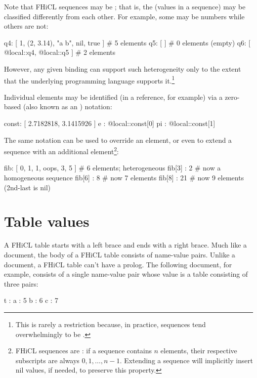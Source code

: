 \documentclass{memarticle}
\newcommand{\fhicl}%
 {FHiCL\xspace}
\begin{document}
Note that \fhicl sequences
may be ;
that is,
the  (values in a sequence)
may be classified differently from each other.
For example,
some may be numbers while others are not:
\Needspace{0.50in}
\begin{fcllisting}[texcl,escapechar=`]
q4: [ 1, (2, 3.14), "a b", nil, true ]  # 5 elements
q5: [ ]                                 # 0 elements (empty)
q6: [ @local::q4, @local::q5 ]          # 2 elements
\end{fcllisting}
However, any given binding
can support such heterogeneity
only to the extent
that the underlying programming language supports it.\footnote{%
  This is rarely a restriction
  because, in practice,
  sequences tend overwhelmingly to be .%
}

Individual elements may be identified
(in a reference, for example)
via a zero-based  (also known as an ) notation:
\Needspace{0.50in}
\begin{fcllisting}[texcl,escapechar=`]
const: [ 2.7182818, 3.1415926 ]
e    : @local::const[0]
pi   : @local::const[1]
\end{fcllisting}
The same notation can be used to override an element,
or even to extend a sequence with an additional element\footnote{%
  \fhicl sequences are :
  if a sequence contains $n$ elements,
  their respective subscripts are always $0, 1, \ldots, n-1$.
  Extending a sequence will implicitly insert
  nil values, if needed, to preserve this property.
}:
\Needspace{0.50in}
\begin{fcllisting}[texcl,escapechar=`]
fib: [ 0, 1, 1, oops, 3, 5 ]  # 6 elements; heterogeneous
fib[3] : 2                    # now a homogeneous sequence
fib[6] : 8                    # now 7 elements
fib[8] : 21                   # now 9 elements (2nd-last is nil)
\end{fcllisting}

\section{Table values}

A \fhicl table starts with a left brace
and ends with a right brace.
Much like a document,
the body of a \fhicl table
consists of name-value pairs.
Unlike a document,
a \fhicl table can't have a prolog.
The following document,
for example,
consists of a single name-value pair
whose value is a table consisting of three pairs:
\Needspace{0.67in}
\begin{fcllisting}[texcl,escapechar=`]
t : {  a : 5
       b : 6
       c : 7
    }
\end{fcllisting}
\end{document}

